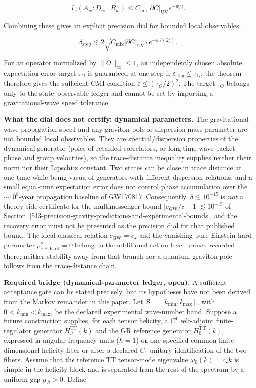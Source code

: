 \[
I_\omega(A_w : D_w \mid B_w)
\le C_{\mathrm{mix}} |\partial C|_{\mathrm{UV}} e^{-w/\xi}.
\]

Combining these gives an explicit precision dial for bounded local observables:

\[
\delta_{\mathrm{step}} \lesssim 2\sqrt{C_{\mathrm{mix}} |\partial C|_{\mathrm{UV}}}
\cdot e^{-w/(2\xi)}.
\]

For an operator normalized by \(\|O\|_\infty\le1\), an independently chosen absolute expectation-error target \(\tau_O\) is guaranteed at one step if \(\delta_{\mathrm{step}}\le\tau_O\); the theorem therefore gives the sufficient CMI condition \(\varepsilon\le(\tau_O/2)^2\). The target \(\tau_O\) belongs only to the state--observable ledger and cannot be set by importing a gravitational-wave speed tolerance.

\textbf{What the dial does not certify: dynamical parameters.} The gravitational-wave propagation speed and any graviton pole or dispersion-mass parameter are not bounded local observables. They are spectral/dispersion properties of the dynamical generator (poles of retarded correlators, or long-time wave-packet phase and group velocities), so the trace-distance inequality supplies neither their norm nor their Lipschitz constant. Two states can be close in trace distance at one time while being vacua of generators with different dispersion relations, and a small equal-time expectation error does not control phase accumulation over the \(\sim 10^8\)-year propagation baseline of GW170817. Consequently, \(\delta \lesssim 10^{-15}\) is \emph{not} a theory-side certificate for the multimessenger bound \(|c_{\mathrm{GW}}/c - 1| \lesssim 10^{-15}\) of Section~\ref{513-precision-gravity-predictions-and-experimental-bounds}, and the recovery error must not be presented as the precision dial for that published bound. The ideal classical relation \(c_{\mathrm{GW}}=c_\star\) and the vanishing pure-Einstein hard parameter \(\mu_{\mathrm{FP,hard}}^2=0\) belong to the additional action-level branch recorded there; neither stability away from that branch nor a quantum graviton pole follows from the trace-distance chain.

\textbf{Required bridge (dynamical-parameter ledger; open).} A sufficient acceptance gate can be stated precisely, but its hypotheses have not been derived from the Markov remainder in this paper. Let \(\mathcal B=[k_{\min},k_{\max}]\), with \(0<k_{\min}<k_{\max}\), be the declared experimental wave-number band. Suppose a future construction supplies, for each tensor helicity, a \(C^1\) self-adjoint finite-regulator generator \(H_\nu^{\mathrm{TT}}(k)\) and the GR reference generator \(H_0^{\mathrm{TT}}(k)\), expressed in angular-frequency units (\(\hbar=1\)) on one specified common finite-dimensional helicity fiber or after a declared \(C^1\) unitary identification of the two fibers. Assume that the reference TT tensor-mode eigenvalue \(\omega_0(k)=c_\star k\) is simple in the helicity block and is separated from the rest of the spectrum by a uniform gap \(g_{\mathcal B}>0\). Define

